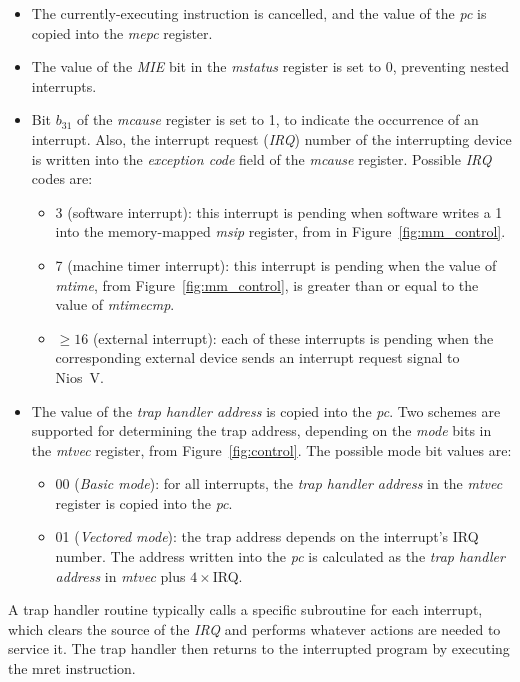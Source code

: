 \documentclass[11pt, twoside, pdftex]{article}
\begin{document}
\begin{itemize}
\item The currently-executing instruction is cancelled, and the value of the {\it pc} is 
copied into the {\it mepc} register. 
\item The value of the {\it MIE} bit in the {\it mstatus} register is set to 0, preventing
nested interrupts. 
\item Bit $b_{31}$ of the {\it mcause} register is set to 1, to indicate the occurrence of an
interrupt. Also, the interrupt request ({\it IRQ}) number of the interrupting device 
is written into the {\it exception code} field of the {\it mcause} register. Possible
{\it IRQ} codes are:
\begin{itemize}
\item 3 (software interrupt): this interrupt is pending when software writes a 1 into the
memory-mapped {\it msip} register, from in Figure~\ref{fig:mm_control}. 
\item 7 (machine timer interrupt): this interrupt is pending when the value of {\it
mtime}, from Figure~\ref{fig:mm_control}, is greater than or equal to the value of {\it mtimecmp}. 
\item $\ge 16$ (external interrupt): each of these interrupts is pending when the corresponding
external device sends an interrupt request signal to Nios~V.
\end{itemize}
\item The value of the {\it trap handler address} is copied into the {\it pc}. Two schemes 
are supported for determining the trap address, depending on the {\it mode} bits in the 
{\it mtvec} register, from Figure~\ref{fig:control}.  The possible mode bit values are:
\begin{itemize}
\item 00 ({\it Basic mode}): for all interrupts, the {\it trap handler address} in the 
{\it mtvec} register is copied into the {\it pc}.
\item 01 ({\it Vectored mode}): the trap address depends on the interrupt's IRQ number. 
The address written into the {\it pc} is calculated as the {\it trap handler address} in
{\it mtvec} plus $4 \times $IRQ.
\end{itemize}
\end{itemize}

A trap handler routine typically calls a specific subroutine for each interrupt, which clears 
the source of the {\it IRQ} and performs whatever actions are needed to service it. The trap 
handler then returns to the interrupted program by executing the {\sf mret} instruction. 
\end{document}
